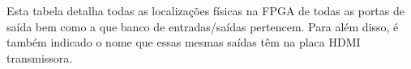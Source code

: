 Esta tabela detalha todas as localizações físicas na FPGA de todas as portas de saída bem como a que banco de entradas/saídas pertencem. Para além disso, é também indicado o nome que essas mesmas saídas têm na placa HDMI transmissora.
%
%
%
